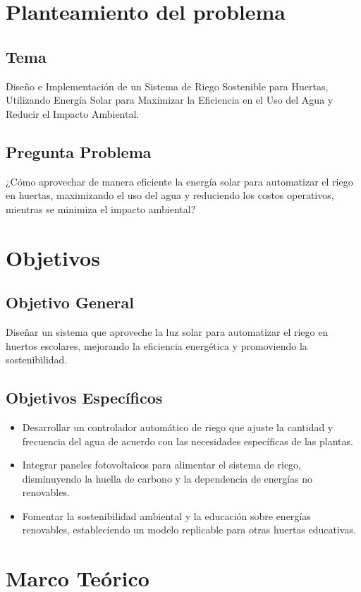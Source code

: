 \documentclass[12pt]{article}
\begin{document}
\section{Planteamiento del problema}
\subsection{Tema}
Diseño e Implementación de un Sistema de Riego Sostenible para Huertas, Utilizando Energía Solar para Maximizar la Eficiencia en el Uso del Agua y Reducir el Impacto Ambiental.

\subsection{Pregunta Problema}
¿Cómo aprovechar de manera eficiente la energía solar para automatizar el riego en huertas, maximizando el uso del agua y reduciendo los costos operativos, mientras se minimiza el impacto ambiental?
\newpage
\section{Objetivos}
\subsection{Objetivo General}
Diseñar un sistema que aproveche la luz solar para automatizar el riego en huertos escolares, mejorando la eficiencia energética y promoviendo la sostenibilidad.


\subsection{Objetivos Específicos}
\begin{itemize}
      \item Desarrollar un controlador automático de riego que ajuste la cantidad y frecuencia del agua de acuerdo con las necesidades específicas de las plantas.
      \item Integrar paneles fotovoltaicos para alimentar el sistema de riego, disminuyendo la huella de carbono y la dependencia de energías no renovables.
      \item Fomentar la sostenibilidad ambiental y la educación sobre energías renovables, estableciendo un modelo replicable para otras huertas educativas.
\end{itemize}
\newpage
\section{Marco Teórico}
\end{document}
